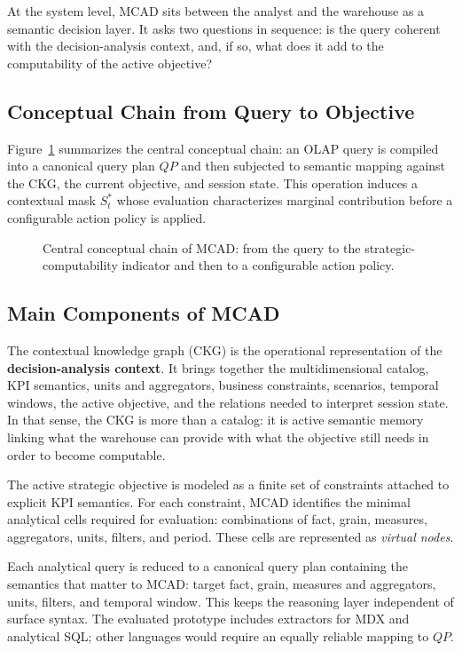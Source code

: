 \documentclass[journal]{IEEEtran}
\begin{document}
At the system level, MCAD sits between the analyst and the warehouse as a semantic decision layer. It asks two questions in sequence: is the query coherent with the decision-analysis context, and, if so, what does it add to the computability of the active objective?

\subsection{Conceptual Chain from Query to Objective}

Figure~\ref{fig:concept-chain} summarizes the central conceptual chain: an OLAP query is compiled into a canonical query plan $QP$ and then subjected to semantic mapping against the CKG, the current objective, and session state. This operation induces a contextual mask $S_t^*$ whose evaluation characterizes marginal contribution before a configurable action policy is applied.

\begin{figure}[!t]
\centering
\resizebox{\textwidth}{!}{}
\caption{Central conceptual chain of MCAD: from the query to the strategic-computability indicator and then to a configurable action policy.}
\label{fig:concept-chain}
\end{figure}

\subsection{Main Components of MCAD}

The contextual knowledge graph (CKG) is the operational representation of the \textbf{decision-analysis context}. It brings together the multidimensional catalog, KPI semantics, units and aggregators, business constraints, scenarios, temporal windows, the active objective, and the relations needed to interpret session state. In that sense, the CKG is more than a catalog: it is active semantic memory linking what the warehouse can provide with what the objective still needs in order to become computable.

The active strategic objective is modeled as a finite set of constraints attached to explicit KPI semantics. For each constraint, MCAD identifies the minimal analytical cells required for evaluation: combinations of fact, grain, measures, aggregators, units, filters, and period. These cells are represented as \emph{virtual nodes}.

Each analytical query is reduced to a canonical query plan containing the semantics that matter to MCAD: target fact, grain, measures and aggregators, units, filters, and temporal window. This keeps the reasoning layer independent of surface syntax. The evaluated prototype includes extractors for MDX and analytical SQL; other languages would require an equally reliable mapping to $QP$.
\end{document}
